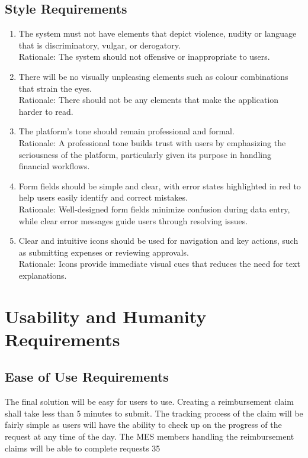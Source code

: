 \documentclass[12pt]{article}
\begin{document}
\subsection{Style Requirements}
\begin{enumerate}
  \item The system must not have elements that depict violence, nudity or language that is discriminatory, vulgar, or derogatory. \\ 
  Rationale: The system should not offensive or inappropriate to users.
  \item There will be no visually unpleasing elements such as colour combinations that strain the eyes. \\ 
  Rationale: There should not be any elements that make the application harder to read.
  \item The platform's tone should remain professional and formal. \\
  Rationale: A professional tone builds trust with users by emphasizing the seriousness of the platform, particularly given its purpose in handling financial workflows.
  \item Form fields should be simple and clear, with error states highlighted in red to help users easily identify and correct mistakes. \\
  Rationale: Well-designed form fields minimize confusion during data entry, while clear error messages guide users through resolving issues.
  \item Clear and intuitive icons should be used for navigation and key actions, such as submitting expenses or reviewing approvals. \\
  Rationale: Icons provide immediate visual cues that reduces the need for text explanations.
\end{enumerate}

\section{Usability and Humanity Requirements}
\subsection{Ease of Use Requirements}
The final solution will be easy for users to use. Creating a reimbursement claim shall take less than 5 minutes to submit. The tracking process of the claim will be fairly simple as users will have the ability to check up on the progress of the request at any time of the day. The MES members handling the reimbursement claims will be able to complete requests 35%
\end{document}
